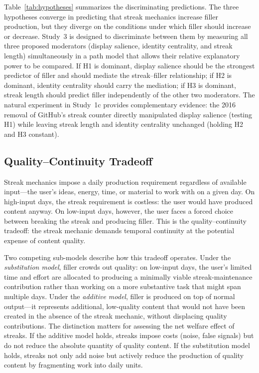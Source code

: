 \documentclass[12pt]{article}
\begin{document}
Table~\ref{tab:hypotheses} summarizes the discriminating predictions. The three hypotheses converge in predicting that streak mechanics increase filler production, but they diverge on the conditions under which filler should increase or decrease. Study~3 is designed to discriminate between them by measuring all three proposed moderators (display salience, identity centrality, and streak length) simultaneously in a path model that allows their relative explanatory power to be compared. If H1 is dominant, display salience should be the strongest predictor of filler and should mediate the streak--filler relationship; if H2 is dominant, identity centrality should carry the mediation; if H3 is dominant, streak length should predict filler independently of the other two moderators. The natural experiment in Study~1c provides complementary evidence: the 2016 removal of GitHub's streak counter directly manipulated display salience (testing H1) while leaving streak length and identity centrality unchanged (holding H2 and H3 constant).

\subsection{Quality--Continuity Tradeoff}
\label{sec:quality-continuity}

Streak mechanics impose a daily production requirement regardless of available input---the user's ideas, energy, time, or material to work with on a given day. On high-input days, the streak requirement is costless: the user would have produced content anyway. On low-input days, however, the user faces a forced choice between breaking the streak and producing filler. This is the quality--continuity tradeoff: the streak mechanic demands temporal continuity at the potential expense of content quality.

Two competing sub-models describe how this tradeoff operates. Under the \emph{substitution model}, filler crowds out quality: on low-input days, the user's limited time and effort are allocated to producing a minimally viable streak-maintenance contribution rather than working on a more substantive task that might span multiple days. Under the \emph{additive model}, filler is produced on top of normal output---it represents additional, low-quality content that would not have been created in the absence of the streak mechanic, without displacing quality contributions. The distinction matters for assessing the net welfare effect of streaks. If the additive model holds, streaks impose costs (noise, false signals) but do not reduce the absolute quantity of quality content. If the substitution model holds, streaks not only add noise but actively reduce the production of quality content by fragmenting work into daily units.
\end{document}
